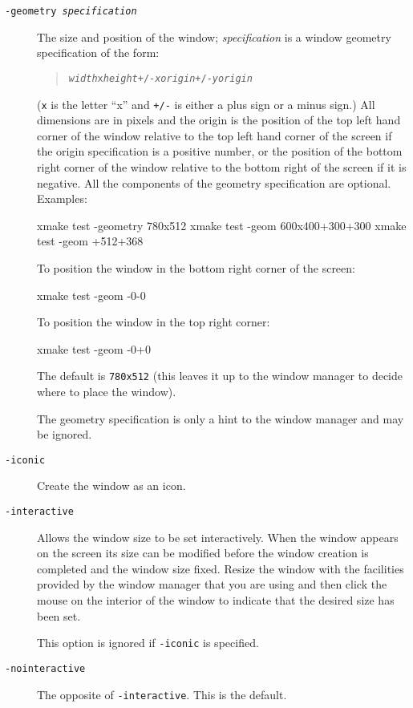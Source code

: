 \documentclass[twoside,11pt,nolof]{starlink}
\begin{document}
\begin{description}
\item[\texttt{-geometry \emph{specification}}\label{geometryOpt}]
The size and position of the window;
\emph{specification} is a window geometry specification of the form:
\begin{quote}\texttt{\emph{width}x\emph{height}+/-\emph{xorigin}+/-\emph{yorigin}}
\end{quote}
(\texttt{x} is the letter ``x'' and \texttt{+/-} is either a plus sign or a
minus sign.)
All dimensions are in pixels and the origin is the position of the top left hand
corner of the window relative to the top left hand corner of the screen
if the origin specification is a positive number, or the position of the
bottom right corner of the window relative to the bottom right of the
screen if it is negative. All
the components of the geometry specification are optional. Examples:
\begin{terminalv}
xmake test -geometry 780x512
xmake test -geom 600x400+300+300
xmake test -geom +512+368
\end{terminalv}
To position the window in the bottom right corner of the screen:
\begin{terminalv}
xmake test -geom -0-0
\end{terminalv}
To position the window in the top right corner:
\begin{terminalv}
xmake test -geom -0+0
\end{terminalv}
The default is \texttt{780x512} (this leaves it up to the window manager to
decide where to place the window).

The geometry specification is only a hint to the window manager and may be
ignored.

\item[\texttt{-iconic}] Create the window as an icon.

\item[\texttt{-interactive}] Allows the window size to be set interactively. When
the window appears on the screen its size can be modified before the window
creation is completed and the window size fixed. Resize the window with the
facilities provided by the window manager that you are using
and then click the mouse on the
interior of the window to indicate that the desired size has been set.

This option is ignored if \texttt{-iconic} is specified.

\item[\texttt{-nointeractive}] The opposite of \texttt{-interactive}. This is
the default.


\end{description}
\end{document}

